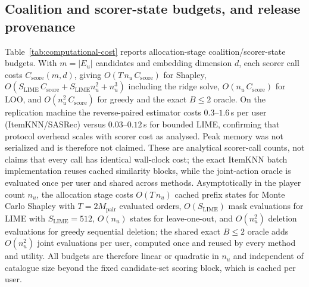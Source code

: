 \documentclass[a4paper,fleqn,doubleblind]{cas-sc}
\begin{document}
\subsection{Coalition and scorer-state budgets, and release provenance}
Table~\ref{tab:computational-cost} reports allocation-stage coalition/scorer-state budgets. With $m=|E_u|$ candidates and embedding dimension $d$, each scorer call costs $C_{\mathrm{score}}(m,d)$, giving $O(T\,n_u\,C_{\mathrm{score}})$ for Shapley, $O(S_{\mathrm{LIME}}\,C_{\mathrm{score}}+S_{\mathrm{LIME}}n_u^2+n_u^3)$ including the ridge solve, $O(n_u\,C_{\mathrm{score}})$ for LOO, and $O(n_u^2\,C_{\mathrm{score}})$ for greedy and the exact $B\le2$ oracle. On the replication machine the reverse-paired estimator costs $0.3$--$1.6$\,s per user (ItemKNN/SASRec) versus $0.03$--$0.12$\,s for bounded LIME, confirming that protocol overhead scales with scorer cost as analysed. Peak memory was not serialized and is therefore not claimed. These are analytical scorer-call counts, not claims that every call has identical wall-clock cost; the exact ItemKNN batch implementation reuses cached similarity blocks, while the joint-action oracle is evaluated once per user and shared across methods. Asymptotically in the player count $n_u$, the allocation stage costs $O(T\,n_u)$ cached prefix states for Monte Carlo Shapley with $T=2M_{\mathrm{pair}}$ evaluated orders, $O(S_{\mathrm{LIME}})$ mask evaluations for LIME with $S_{\mathrm{LIME}}=512$, $O(n_u)$ states for leave-one-out, and $O(n_u^2)$ deletion evaluations for greedy sequential deletion; the shared exact $B\le2$ oracle adds $O(n_u^2)$ joint evaluations per user, computed once and reused by every method and utility. All budgets are therefore linear or quadratic in $n_u$ and independent of catalogue size beyond the fixed candidate-set scoring block, which is cached per user.
\end{document}
